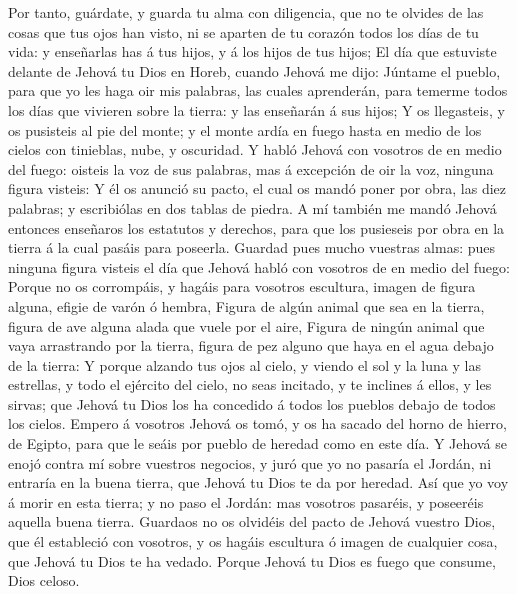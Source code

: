  Por tanto, guárdate, y guarda tu alma con diligencia, que
no te olvides de las cosas que tus ojos han visto, ni se aparten de tu
corazón todos los días de tu vida: y enseñarlas has á tus hijos, y á los
hijos de tus hijos;  El día que estuviste delante de
Jehová tu Dios en Horeb, cuando Jehová me dijo: Júntame el pueblo, para
que yo les haga oir mis palabras, las cuales aprenderán, para temerme
todos los días que vivieren sobre la tierra: y las enseñarán á sus
hijos;  Y os llegasteis, y os pusisteis al pie del monte;
y el monte ardía en fuego hasta en medio de los cielos con tinieblas,
nube, y oscuridad.  Y habló Jehová con vosotros de en
medio del fuego: oisteis la voz de sus palabras, mas á excepción de oir
la voz, ninguna figura visteis:  Y él os anunció su
pacto, el cual os mandó poner por obra, las diez palabras; y escribiólas
en dos tablas de piedra.  A mí también me mandó Jehová
entonces enseñaros los estatutos y derechos, para que los pusieseis por
obra en la tierra á la cual pasáis para poseerla. 
Guardad pues mucho vuestras almas: pues ninguna figura visteis el día
que Jehová habló con vosotros de en medio del fuego: 
Porque no os corrompáis, y hagáis para vosotros escultura, imagen de
figura alguna, efigie de varón ó hembra,  Figura de algún
animal que sea en la tierra, figura de ave alguna alada que vuele por el
aire,  Figura de ningún animal que vaya arrastrando por
la tierra, figura de pez alguno que haya en el agua debajo de la tierra:
 Y porque alzando tus ojos al cielo, y viendo el sol y la
luna y las estrellas, y todo el ejército del cielo, no seas incitado, y
te inclines á ellos, y les sirvas; que Jehová tu Dios los ha concedido á
todos los pueblos debajo de todos los cielos.  Empero á
vosotros Jehová os tomó, y os ha sacado del horno de hierro, de Egipto,
para que le seáis por pueblo de heredad como en este día.
 Y Jehová se enojó contra mí sobre vuestros negocios, y
juró que yo no pasaría el Jordán, ni entraría en la buena tierra, que
Jehová tu Dios te da por heredad.  Así que yo voy á morir
en esta tierra; y no paso el Jordán: mas vosotros pasaréis, y poseeréis
aquella buena tierra.  Guardaos no os olvidéis del pacto
de Jehová vuestro Dios, que él estableció con vosotros, y os hagáis
escultura ó imagen de cualquier cosa, que Jehová tu Dios te ha vedado.
 Porque Jehová tu Dios es fuego que consume, Dios celoso.

